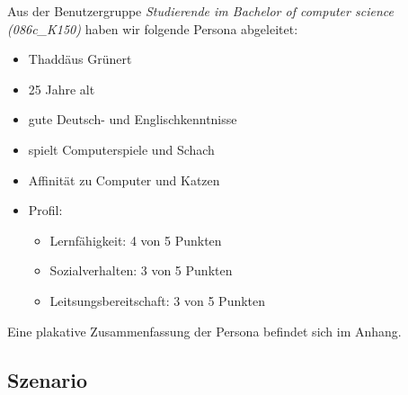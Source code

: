\documentclass{article}
\begin{document}
Aus der Benutzergruppe \textit{Studierende im Bachelor of computer science (086c\_K150)} haben wir folgende Persona abgeleitet:
\begin{itemize}
\item Thaddäus Grünert
\item 25 Jahre alt
\item gute Deutsch- und Englischkenntnisse
\item spielt Computerspiele und Schach
\item Affinität zu Computer und Katzen
\item Profil:
	\begin{itemize}
	\item Lernfähigkeit: 4 von 5 Punkten
	\item Sozialverhalten: 3 von 5 Punkten
	\item Leitsungsbereitschaft: 3 von 5 Punkten
	\end{itemize}
\end{itemize}
Eine plakative Zusammenfassung der Persona befindet sich im Anhang.

\subsection{Szenario}
\end{document}

